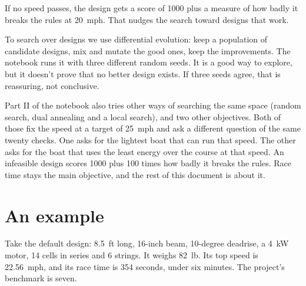\documentclass[11pt,a4paper]{article}
\renewcommand{\_}{\textunderscore\allowbreak}
\begin{document}
If no speed passes, the design gets a score of 1000 plus a measure of how badly it breaks the rules at 20~mph. That nudges the search toward designs that work.

To search over designs we use differential evolution: keep a population of candidate designs, mix and mutate the good ones, keep the improvements. The notebook runs it with three different random seeds.
It is a good way to explore, but it doesn't prove that no better design exists. If three seeds agree, that is reassuring, not conclusive.

Part II of the notebook also tries other ways of searching the same space (random search, dual annealing and a local search), and two other objectives.
Both of those fix the speed at a target of 25~mph and ask a different question of the same twenty checks. One asks for the lightest boat that can run that speed. The other asks for the boat
that uses the least energy over the course at that speed. An infeasible design scores 1000 plus 100 times how badly it breaks the rules. Race time stays the main objective, and the rest of this document is about it.

\section*{An example}

Take the default design: 8.5~ft long, 16-inch beam, 10-degree deadrise, a 4~kW motor, 14 cells in series and 6 strings. It weighs 82~lb. Its top speed is 22.56~mph, and its race time is 354 seconds,
under six minutes. The project's benchmark is seven.
\end{document}
